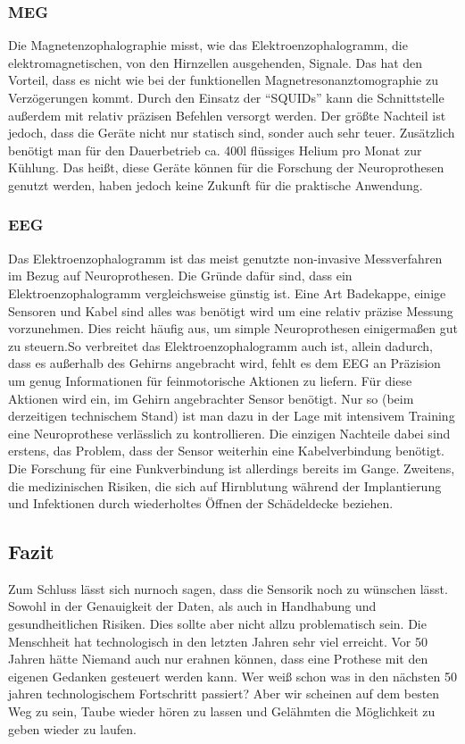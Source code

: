 \documentclass[11pt,ngerman,parskip=half]{scrartcl}
\begin{document}
\subsubsection{MEG}
Die Magnetenzophalographie misst, wie das Elektroenzophalogramm, die
elektromagnetischen, von den Hirnzellen ausgehenden, Signale. Das hat den
Vorteil, dass es nicht wie bei der funktionellen Magnetresonanztomographie zu
Verzögerungen kommt. Durch den Einsatz der \enquote{SQUIDs} kann die
Schnittstelle außerdem mit relativ präzisen Befehlen versorgt werden. Der
größte Nachteil ist jedoch, dass die Geräte nicht nur statisch sind, sonder
auch sehr teuer. Zusätzlich benötigt man für den Dauerbetrieb ca. 400l
flüssiges Helium pro Monat zur Kühlung. Das heißt, diese Geräte können für
die Forschung der Neuroprothesen genutzt werden, haben jedoch keine Zukunft
für die praktische Anwendung.

\subsubsection{EEG}
Das Elektroenzophalogramm ist das meist genutzte non-invasive Messverfahren
im Bezug auf Neuroprothesen. Die Gründe dafür sind, dass ein
Elektroenzophalogramm vergleichsweise günstig ist. Eine Art Badekappe, einige
Sensoren und Kabel sind alles was benötigt wird um eine relativ präzise
Messung vorzunehmen. Dies reicht häufig aus, um simple Neuroprothesen
einigermaßen gut zu steuern.So verbreitet das Elektroenzophalogramm auch ist,
allein dadurch, dass es außerhalb des Gehirns angebracht wird, fehlt es dem
EEG an Präzision um genug Informationen für feinmotorische Aktionen zu
liefern. Für diese Aktionen wird ein, im Gehirn angebrachter Sensor benötigt.
Nur so (beim derzeitigen technischem Stand) ist man dazu in der Lage mit
intensivem Training eine Neuroprothese verlässlich zu kontrollieren. Die
einzigen Nachteile dabei sind erstens, das Problem, dass der Sensor weiterhin
eine Kabelverbindung benötigt. Die Forschung für eine Funkverbindung ist
allerdings bereits im Gange. Zweitens, die medizinischen Risiken, die sich
auf Hirnblutung während der Implantierung und Infektionen durch wiederholtes
Öffnen der Schädeldecke beziehen.

\subsection{Fazit}
Zum Schluss lässt sich nurnoch sagen, dass die Sensorik noch zu wünschen
lässt. Sowohl in der Genauigkeit der Daten, als auch in Handhabung und
gesundheitlichen Risiken. Dies sollte aber nicht allzu problematisch sein.
Die Menschheit hat technologisch in den letzten Jahren sehr viel erreicht.
Vor 50 Jahren hätte Niemand auch nur erahnen können, dass eine Prothese mit
den eigenen Gedanken gesteuert werden kann. Wer weiß schon was in den
nächsten 50 jahren technologischem Fortschritt passiert? Aber wir scheinen
auf dem besten Weg zu sein, Taube wieder hören zu lassen und Gelähmten die
Möglichkeit zu geben wieder zu laufen.
\parencites{eegw}{fmrt}{meg}{bciuinvasiv}
\end{document}
